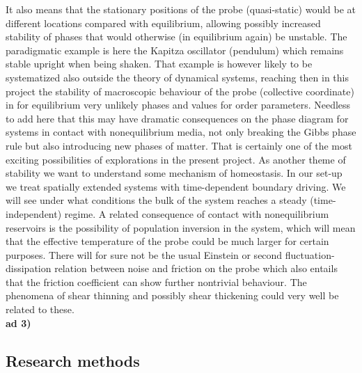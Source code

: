 It also means that the stationary positions of the probe (quasi-static) would be at different locations compared with equilibrium, allowing possibly increased stability of phases that would otherwise (in equilibrium again) be unstable.  The paradigmatic example is here the Kapitza oscillator (pendulum) which remains stable upright when being shaken.  That example is however likely to be systematized also outside the theory of dynamical systems, reaching then in this project the stability of macroscopic behaviour of the probe (collective coordinate) in for equilibrium very unlikely phases and values for order parameters.  Needless to  add here that this may have dramatic consequences on the phase diagram for systems in contact with nonequilibrium media, not only breaking the Gibbs phase rule but also introducing new phases of matter.  That is certainly one of the most exciting possibilities of explorations in the present project. As another theme of stability we want to understand some mechanism of homeostasis. In our set-up we treat spatially extended systems with time-dependent boundary driving. We will see under what conditions the bulk of the system reaches a steady (time-independent) regime. A related consequence of contact with nonequilibrium reservoirs is the possibility of population inversion in the system, which will mean that the effective temperature of the probe could be much larger for certain purposes.  There will for sure not be the usual Einstein or second fluctuation-dissipation relation between noise and friction on the probe which also entails that the friction coefficient can show further nontrivial behaviour.  The phenomena of shear thinning and possibly shear thickening could very well be related to these.\\
{\bf ad 3)} 










\subsection{Research methods}\label{sec:methods}

